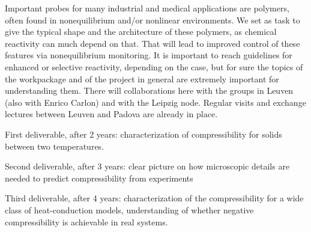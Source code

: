 \begin{workpackage}
\begin{tasklist}
  \begin{task}[title=TASK3,id=task3,PM=6,lead=UNIPD,wphases={18-24!0.5,24-48!1},partners={KUL,ULEI}]
Important probes for many industrial and medical applications are polymers, often found in nonequilibrium and/or nonlinear environments.
We set as task to give the typical shape and the architecture of these polymers, as chemical reactivity can much depend on that.
That will lead to improved control of these features via nonequilibrium monitoring.
It is important to reach guidelines for enhanced or selective reactivity, depending on the case, but for sure the topics of the workpackage and of the project in general are extremely important for understanding them.
There will collaborations here with the groups in Leuven (also with Enrico Carlon) and with the Leipzig node.  Regular visits and exchange lectures between Leuven and Padova are already in place.
  \end{task}

\end{tasklist}

\begin{wpdelivs}
  \begin{wpdeliv}[due=24,id=mydeliv1,dissem=PU,nature=DEM,lead=UNIPD]
      {First deliverable, after 2 years: characterization of compressibility for solids between two temperatures.}
  \end{wpdeliv}
  \begin{wpdeliv}[due=36,id=mydeliv2,dissem=PU,nature=DEM,lead=UNIPD]
      {Second deliverable, after 3 years: clear picture on how microscopic details are needed to predict compressibility from experiments}
  \end{wpdeliv}
  \begin{wpdeliv}[due=48,id=mydeliv3,dissem=PU,nature=DEM,lead=UNIPD]
      {Third deliverable, after 4 years: characterization of the compressibility for a wide class of heat-conduction models, understanding of whether negative compressibility is achievable in real systems.}
\end{wpdeliv}
\end{wpdelivs}




\end{workpackage}
